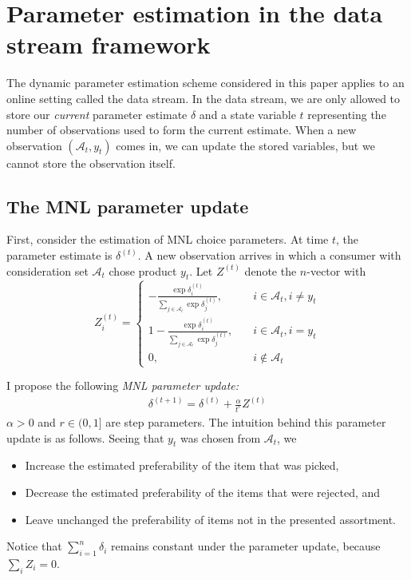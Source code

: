 \documentclass[preprint,12pt,authoryear]{elsarticle}
\begin{document}
\section{Parameter estimation in the data stream framework}
The dynamic parameter estimation scheme considered in this paper applies to an online setting called the data stream. In the data stream, we are only allowed to store our \emph{current} parameter estimate $\delta$ and a state variable $t$ representing the number of observations used to form the current estimate. When a new observation $(\mathcal{A}_t, y_t)$ comes in, we can update the stored variables, but we cannot store the observation itself. %

\subsection{The MNL parameter update}
First, consider the estimation of MNL choice parameters. At time $t$, the parameter estimate is $\delta^{(t)}$. A new observation arrives in which a consumer with consideration set $\mathcal{A}_t$ chose product $y_t$. Let $Z^{(t)}$ denote the $n$-vector with
\begin{equation}Z^{(t)}_i =
\begin{cases}
 - \frac{\exp \delta^{(t)}_i}{\sum_{j\in \mathcal{A}_t} \exp \delta^{(t)}_j}, \quad& i \in \mathcal{A}_t, i\neq y_t \\
1 - \frac{\exp \delta^{(t)}_i}{\sum_{j\in \mathcal{A}_t} \exp \delta^{(t)}_j} , \quad& i \in \mathcal{A}_t, i =  y_t \\
0, \quad & i \notin \mathcal{A}_t
\end{cases}
\end{equation}

I propose the following \emph{MNL parameter update:}
\begin{align} \label{mnlparameterupdate}
\delta^{(t+1)} = \delta^{(t)} + \frac{\alpha}{t^r} Z^{(t)}
\end{align}
$\alpha >0$ and $r \in (0, 1]$ are step parameters. The intuition behind this parameter update is as follows. Seeing that $y_t$ was chosen from $\mathcal{A}_t$, we 
\begin{itemize}
\item Increase the estimated preferability of the item that was picked,
\item Decrease the estimated preferability of the items that were rejected, and
\item Leave unchanged the preferability of items not in the presented assortment.
\end{itemize}
Notice that $\sum_{i=1}^n \delta_i$ remains constant under the parameter update, because $\sum_i Z_i = 0$. 
\end{document}
